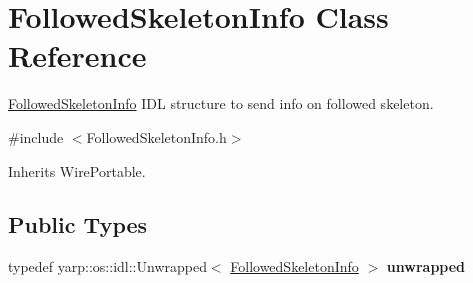 \section{Followed\+Skeleton\+Info Class Reference}
\label{classFollowedSkeletonInfo}


\mbox{\hyperlink{classFollowedSkeletonInfo}{Followed\+Skeleton\+Info}} I\+DL structure to send info on followed skeleton.  




{\ttfamily \#include $<$Followed\+Skeleton\+Info.\+h$>$}



Inherits Wire\+Portable.

\subsection*{Public Types}
\begin{DoxyCompactItemize}
\item 
\mbox{\label{classFollowedSkeletonInfo_ae6cdfa523b1a2fdb707ebce7ac843203}} 
typedef yarp\+::os\+::idl\+::\+Unwrapped$<$ \mbox{\hyperlink{classFollowedSkeletonInfo}{Followed\+Skeleton\+Info}} $>$ {\bfseries unwrapped}
\end{DoxyCompactItemize}
